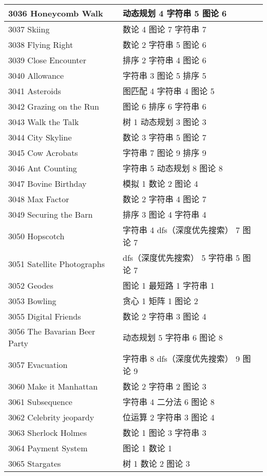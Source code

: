 \begin{longtable}{| p{} | p{} |}
 3036 Honeycomb Walk  & 动态规划 4 字符串 5 图论 6 \\ \hline
 3037 Skiing  & 数论 4 图论 7 字符串 7 \\ \hline
 3038 Flying Right  & 数论 2 字符串 5 图论 6 \\ \hline
 3039 Close Encounter  & 排序 2 字符串 4 图论 6 \\ \hline
 3040 Allowance  & 字符串 3 图论 5 排序 5 \\ \hline
 3041 Asteroids  & 图匹配 4 字符串 4 图论 5 \\ \hline
 3042 Grazing on the Run  & 图论 6 排序 6 字符串 6 \\ \hline
 3043 Walk the Talk  & 树 1 动态规划 3 图论 3 \\ \hline
 3044 City Skyline  & 数论 3 字符串 5 图论 7 \\ \hline
 3045 Cow Acrobats  & 字符串 7 图论 9 排序 9 \\ \hline
 3046 Ant Counting  & 字符串 5 动态规划 8 图论 8 \\ \hline
 3047 Bovine Birthday  & 模拟 1 数论 2 图论 4 \\ \hline
 3048 Max Factor  & 数论 2 字符串 4 图论 7 \\ \hline
 3049 Securing the Barn  & 排序 3 图论 4 字符串 4 \\ \hline
 3050 Hopscotch  & 字符串 4 dfs（深度优先搜索） 7 图论 7 \\ \hline
 3051 Satellite Photographs  & dfs（深度优先搜索） 5 字符串 5 图论 7 \\ \hline
 3052 Geodes  & 图论 1 最短路 1 字符串 1 \\ \hline
 3053 Bowling  & 贪心 1 矩阵 1 图论 2 \\ \hline
 3055 Digital Friends  & 数论 2 字符串 3 图论 4 \\ \hline
 3056 The Bavarian Beer Party  & 动态规划 5 字符串 6 图论 8 \\ \hline
 3057 Evacuation  & 字符串 8 dfs（深度优先搜索） 9 图论 9 \\ \hline
 3060 Make it Manhattan  & 数论 2 字符串 2 图论 3 \\ \hline
 3061 Subsequence  & 字符串 4 二分法 6 图论 8 \\ \hline
 3062 Celebrity jeopardy  & 位运算 2 字符串 3 图论 4 \\ \hline
 3063 Sherlock Holmes  & 数论 1 图论 3 字符串 3 \\ \hline
 3064 Payment System  & 图论 1 数论 1 \\ \hline
 3065 Stargates  & 树 1 数论 2 图论 3 \\ \hline

\end{longtable}
